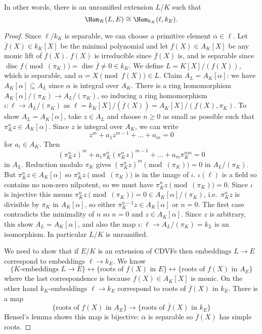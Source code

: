\documentclass[a4paper]{article}
\begin{document}
In other words, there is an unramified extension \(L/K\) such that
\[
  \Hom_K(L, E) \cong \Hom_{k_K}(\ell, k_E).
\]

\begin{proof}
  Since \(\ell/k_K\) is separable, we can choose a primitive element \(\overline \alpha \in \ell\). Let \(\overline f(X) \in k_K[X]\) be the minimal polynomial and let \(f(X) \in A_K[X]\) be any monic lift of \(\overline f(X)\). \(f(X)\) is irreducible since \(\overline f(X)\) is, and is separable since \(\operatorname{disc} f \pmod{(\pi_K)} = \operatorname{disc} \overline f \neq 0 \in k_K\). We define \(L = K[X]/(f(X))\), which is separable, and \(\alpha = X \pmod{f(X)} \in L\). Claim \(A_L = A_K[\alpha]\): we have \(A_K[\alpha] \subseteq A_L\) since \(\alpha\) is integral over \(A_K\). There is a ring homomorphism \(A_K[\alpha]/(\pi_K) \to A_L/(\pi_K)\), so inducing a ring homomorphism \(\iota: \ell \to A_L/(\pi_K)\) as \(\ell = k_K[X]/(\overline f(X)) = A_K[X]/(f(X), \pi_K)\). To show \(A_L = A_K[\alpha]\), take \(z \in A_L\) and choose \(n \geq 0\) as small as possible such that \(\pi_K^nz \in A_K[\alpha]\). Since \(z\) is integral over \(A_K\), we can write
  \[
    z^m + a_1z^{m - 1} + \dots + a_m = 0
  \]
  for \(a_i \in A_K\). Then
  \[
    (\pi_K^n z)^m + a_1\pi_K^n (\pi_K^nz)^{m - 1} + \dots + a_m \pi_K^{nm} = 0
  \]
  in \(A_L\). Reduction modulo \(\pi_K\) gives \((\pi_K^n z)^m \pmod{(\pi_K)} = 0\) in \(A_L/(\pi_K)\). But \(\pi^n_K z \in A_K[\alpha]\) so \(\pi^n_K z \pmod{(\pi_K)}\) is in the image of \(\iota\). \(\iota(\ell)\) is a field so contains no non-zero nilpotent, so we must have \(\pi_K^n z \pmod{(\pi_K)} = 0\). Since \(\iota\) is injective this means \(\pi_K^n z \pmod{(\pi_K)} = 0 \in A_K[\alpha]/(\pi_K)\), i.e.\ \(\pi_K^n z\) is divisible by \(\pi_K\) in \(A_K[\alpha]\), so either \(\pi_K^{n - 1}z \in A_K[\alpha]\) or \(n = 0\). The first case contradicts the minimality of \(n\) so \(n = 0\) and \(z \in A_K[\alpha]\). Since \(z\) is arbitrary, this show \(A_L = A_K[\alpha]\), and also the map \(\iota: \ell \to A_L/(\pi_K) = k_L\) is an isomorphism. In particular \(L/K\) is unramified.

  We need to show that if \(E/K\) is an extension of CDVFs then embeddings \(L \to E\) correspond to embeddings \(\ell \to k_E\). We know
  \[
    \{K\text{-embeddings } L \to E\}
    \longleftrightarrow
    \{\text{roots of } f(X) \text{ in } E\}
    \longleftrightarrow
    \{\text{roots of } f(X) \text{ in } A_E\}
  \]
  where the last correspondence is because \(f(X) \in A_K[X]\) is monic. On the other hand \(k_K\)-embeddings \(\ell \to k_E\) correspond to roots of \(\overline f(X)\) in \(k_E\). There is a map
  \[
    \{\text{roots of } f(X) \text{ in } A_E\}
    \to
    \{\text{roots of } \overline f(X) \text{ in } k_E\}
  \]
  Hensel's lemma shows this map is bijective: \(\overline \alpha\) is separable so \(\overline f(X)\) has simple roots.
\end{proof}
\end{document}
